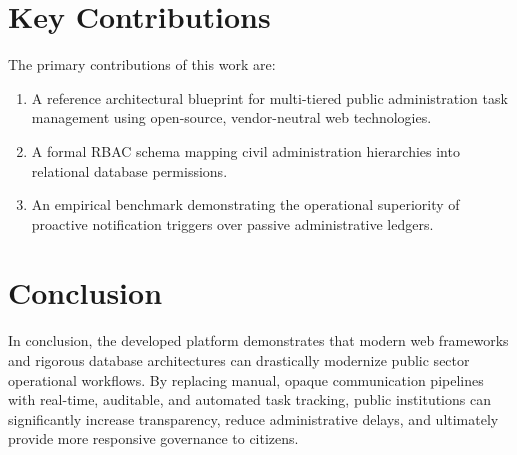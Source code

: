 \section{Key Contributions}
\label{sec:contributions}
The primary contributions of this work are:
\begin{enumerate}
    \item A reference architectural blueprint for multi-tiered public administration task management using open-source, vendor-neutral web technologies.
    \item A formal RBAC schema mapping civil administration hierarchies into relational database permissions.
    \item An empirical benchmark demonstrating the operational superiority of proactive notification triggers over passive administrative ledgers.
\end{enumerate}

\section{Conclusion}
\label{sec:final_conclusion}
In conclusion, the developed platform demonstrates that modern web frameworks and rigorous database architectures can drastically modernize public sector operational workflows. By replacing manual, opaque communication pipelines with real-time, auditable, and automated task tracking, public institutions can significantly increase transparency, reduce administrative delays, and ultimately provide more responsive governance to citizens.
